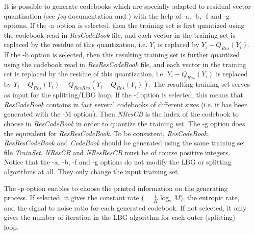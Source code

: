 It is possible to generate codebooks which are specially adapted to residual 
vector quantization (see {\em fvq} documentation and \cite{gersho.gray:vector}) 
with the help of -a, -b, -f and -g options. If the -a option is selected, 
then the training set is first quantized using the codebook read in 
{\em ResCodeBook} file, and each vector in the training set is 
replaced by the residue of this quantization, i.e. $Y_i$ is replaced 
by $Y_i-Q_{Res}(Y_i)$. If the -b option is selected, then this resulting 
training set is further quantized using the codebook read in 
{\em ResResCodeBook} file, and each vector in the training set is 
replaced by the residue of this quantization, i.e. $Y_i-Q_{Res}(Y_i)$ 
is replaced by $Y_i-Q_{Res}(Y_i) - Q_{ResRes}(Y_i-Q_{Res}(Y_i))$. 
The resulting training set serves as input for the splitting/LBG loop. 
If the -f option is selected, this means that {\em ResCodeBook} 
contains in fact several codebooks of different sizes (i.e. it has 
been generated with the -M option). Then {\em NResCB} is the index 
of the codebook to choose in {\em ResCodeBook} in order to quantize 
the training set. The -g option does the equivalent for {\em ResResCodeBook}. 
To be consistent, {\em ResCodeBook}, {\em ResResCodeBook} and {\em CodeBook}
should be generated using the same training set file {\em TrainSet}. 
{\em NResCB} and {\em NResResCB} must be of course positive integers. 
Notice that the -a, -b, -f and -g options do not modify the LBG 
or splitting algorithms at all. They only change the input training set. 

The -p option enables to choose the printed information on the 
generating process. If selected, it gives the constant rate 
($= \frac{1}{K} \log_2 M$), the entropic rate, and the signal to noise ratio 
for each generated codebook. If not selected, it only gives the number 
of iteration in the LBG algorithm for each outer (splitting) loop. 

\vspace{0.5cm}

